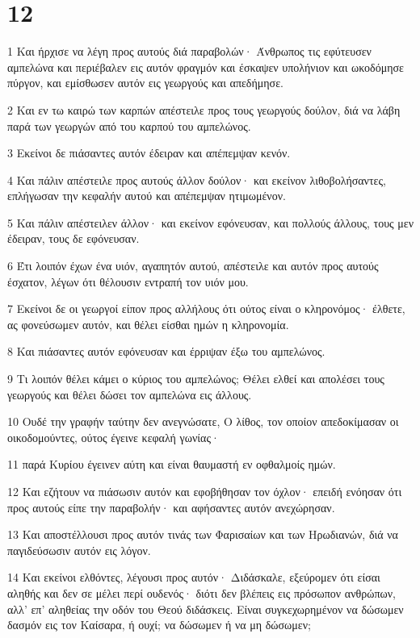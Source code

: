 \chapter{12}

\par 1 Και ήρχισε να λέγη προς αυτούς διά παραβολών· Άνθρωπος τις εφύτευσεν αμπελώνα και περιέβαλεν εις αυτόν φραγμόν και έσκαψεν υπολήνιον και ωκοδόμησε πύργον, και εμίσθωσεν αυτόν εις γεωργούς και απεδήμησε.
\par 2 Και εν τω καιρώ των καρπών απέστειλε προς τους γεωργούς δούλον, διά να λάβη παρά των γεωργών από του καρπού του αμπελώνος.
\par 3 Εκείνοι δε πιάσαντες αυτόν έδειραν και απέπεμψαν κενόν.
\par 4 Και πάλιν απέστειλε προς αυτούς άλλον δούλον· και εκείνον λιθοβολήσαντες, επλήγωσαν την κεφαλήν αυτού και απέπεμψαν ητιμωμένον.
\par 5 Και πάλιν απέστειλεν άλλον· και εκείνον εφόνευσαν, και πολλούς άλλους, τους μεν έδειραν, τους δε εφόνευσαν.
\par 6 Έτι λοιπόν έχων ένα υιόν, αγαπητόν αυτού, απέστειλε και αυτόν προς αυτούς έσχατον, λέγων ότι θέλουσιν εντραπή τον υιόν μου.
\par 7 Εκείνοι δε οι γεωργοί είπον προς αλλήλους ότι ούτος είναι ο κληρονόμος· έλθετε, ας φονεύσωμεν αυτόν, και θέλει είσθαι ημών η κληρονομία.
\par 8 Και πιάσαντες αυτόν εφόνευσαν και έρριψαν έξω του αμπελώνος.
\par 9 Τι λοιπόν θέλει κάμει ο κύριος του αμπελώνος; Θέλει ελθεί και απολέσει τους γεωργούς και θέλει δώσει τον αμπελώνα εις άλλους.
\par 10 Ουδέ την γραφήν ταύτην δεν ανεγνώσατε, Ο λίθος, τον οποίον απεδοκίμασαν οι οικοδομούντες, ούτος έγεινε κεφαλή γωνίας·
\par 11 παρά Κυρίου έγεινεν αύτη και είναι θαυμαστή εν οφθαλμοίς ημών.
\par 12 Και εζήτουν να πιάσωσιν αυτόν και εφοβήθησαν τον όχλον· επειδή ενόησαν ότι προς αυτούς είπε την παραβολήν· και αφήσαντες αυτόν ανεχώρησαν.
\par 13 Και αποστέλλουσι προς αυτόν τινάς των Φαρισαίων και των Ηρωδιανών, διά να παγιδεύσωσιν αυτόν εις λόγον.
\par 14 Και εκείνοι ελθόντες, λέγουσι προς αυτόν· Διδάσκαλε, εξεύρομεν ότι είσαι αληθής και δεν σε μέλει περί ουδενός· διότι δεν βλέπεις εις πρόσωπον ανθρώπων, αλλ' επ' αληθείας την οδόν του Θεού διδάσκεις. Είναι συγκεχωρημένον να δώσωμεν δασμόν εις τον Καίσαρα, ή ουχί; να δώσωμεν ή να μη δώσωμεν;
